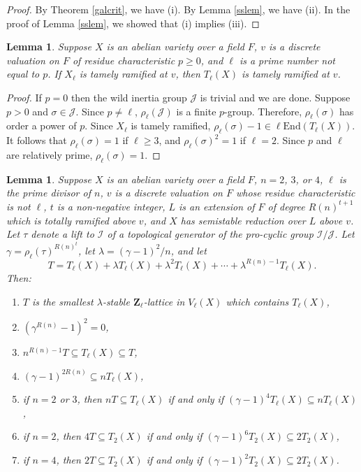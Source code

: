 \documentclass{amsart}
\def\Z{{\mathbf Z}}
\def\R{{\mathbf R}}
\def\End{\mathrm{End}}
\def\I{{\mathcal I}}
\def\J{{\mathcal J}}
\def\R{R}
\newtheorem{lem}[thm]{Lemma}
\theoremstyle{definition}
\begin{document}
\begin{proof}
By Theorem \ref{galcrit}, we have (i). By Lemma \ref{sslem}, we have (ii).
In the proof of Lemma \ref{sslem}, we showed that (i) implies (iii).
\end{proof}

\begin{lem}
\label{tame}
Suppose $X$ is an abelian variety over a field $F$, $v$ is a discrete 
valuation on $F$ of residue characteristic $p \ge 0$, and 
$\ell$ is a prime number not equal to $p$. 
If $X_\ell$ is tamely ramified at $v$, then $T_\ell(X)$ is
tamely ramified at $v$.
\end{lem}

\begin{proof}
If $p = 0$ then the wild inertia group $\J$ is 
trivial and we are done.
Suppose $p > 0$ and $\sigma \in \J$. 
Since $p \ne \ell$, $\rho_{\ell}(\J)$ is a finite $p$-group.
Therefore, $\rho_{\ell}(\sigma)$ has order a power of $p$.
Since $X_\ell$ is tamely ramified, 
$\rho_{\ell}(\sigma)-1 \in \ell\End(T_\ell(X))$.
It follows that $\rho_{\ell}(\sigma) = 1$ if $\ell \ge 3$,
and $\rho_{\ell}(\sigma)^2 = 1$ if $\ell = 2$. 
Since $p$ and $\ell$ are relatively prime, 
$\rho_{\ell}(\sigma) = 1$.
\end{proof}

\begin{lem}
\label{lemT}
Suppose $X$ is an abelian variety over a field $F$, $n = 2$, $3$, or 
$4$, $\ell$ is the prime divisor of $n$,
$v$ is a discrete valuation on $F$ whose residue characteristic is not
$\ell$, $t$ is a non-negative integer,
$L$ is an extension of $F$ of degree $R(n)^{t+1}$
which is totally ramified above $v$, 
and $X$ has semistable reduction
over $L$ above $v$. Let $\tau$ denote a lift to $\I$ of a topological 
generator of the pro-cyclic group $\I/\J$. 
Let $\gamma = \rho_{\ell}(\tau)^{\R(n)^t}$, 
let $\lambda = (\gamma - 1)^2/n$, and let
$$T = T_\ell(X) + {\lambda}T_\ell(X) + {\lambda^2}T_\ell(X) + \cdots + 
{\lambda^{R(n)-1}}T_\ell(X).$$
Then:
\begin{enumerate}
\item[(a)]  $T$ is the smallest $\lambda$-stable $\Z_\ell$-lattice 
in $V_\ell(X)$ which contains $T_{\ell}(X)$,
 \item[(b)]  $(\gamma^{R(n)} - 1)^{2} = 0$,
 \item[(c)]  $n^{R(n)-1}T \subseteq T_{\ell}(X) \subseteq T$,
 \item[(d)]  $(\gamma - 1)^{2R(n)} \subseteq nT_{\ell}(X)$,
 \item[(e)]  if $n = 2$ or $3$, then 
 $nT \subseteq T_{\ell}(X)$ if and only if 
 $(\gamma - 1)^{4}T_{\ell}(X) \subseteq nT_{\ell}(X)$,
 \item[(f)]  if $n = 2$, then $4T \subseteq T_{2}(X)$ if and only if
 $(\gamma - 1)^{6}T_{2}(X) \subseteq 2T_{2}(X)$,
 \item[(g)]  if $n = 4$, then $2T \subseteq T_{2}(X)$ if and only if
 $(\gamma - 1)^{2}T_{2}(X) \subseteq 2T_{2}(X)$. 
\end{enumerate}
\end{lem}
\end{document}
